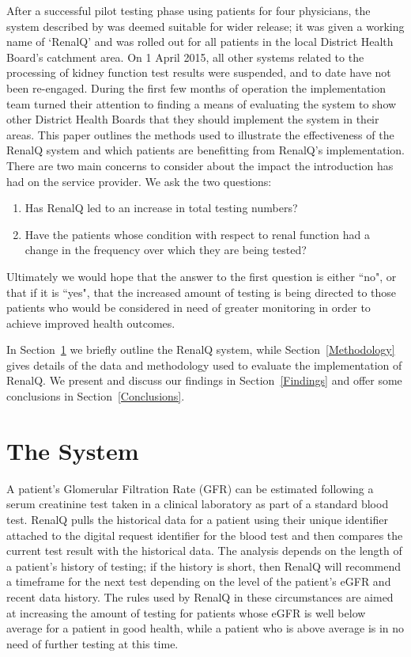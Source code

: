 After a successful pilot testing phase using patients for four physicians, the system described by \citet{GodfreyEtAl2014KidneyPaper}  was deemed suitable for wider release; it was given a working name of `RenalQ' and was rolled out for all patients in the local District Health Board's catchment area. On 1 April 2015, all other systems related to the processing of kidney function test results were suspended, and to date have not been re-engaged. %
During the first few months of operation the implementation team turned their attention to finding a means of evaluating the system to show other District Health Boards that they should implement the system in their areas. This paper outlines the methods used to illustrate the effectiveness of the RenalQ system and which patients are benefitting from RenalQ's implementation.
There are two main concerns to consider about the impact the introduction has had on the service provider. We ask the two questions: \begin{enumerate}
\item Has RenalQ led to an increase in total testing numbers?
\item Have the patients whose condition with respect to renal function had a change in the frequency over which they are being tested? 
\end{enumerate}
Ultimately we would hope that the answer to the first question is either ``no", or that if it is ``yes", that the increased amount of testing is being directed to those patients who would be considered in need of greater monitoring in order to achieve improved health outcomes.

In Section~\ref{TheSystem} we briefly outline the RenalQ	 system, while Section~\ref{Methodology} gives details of the data and methodology used to evaluate the implementation of RenalQ. We present and discuss our findings in Section~\ref{Findings} and offer some conclusions in Section~\ref{Conclusions}.

\section{The System}  \label{TheSystem} 

A patient's Glomerular Filtration Rate (GFR) can be estimated  following  a serum creatinine test taken in a clinical laboratory as part of a standard blood test. RenalQ pulls the historical data for a patient using their unique identifier attached to the digital request identifier for the blood test and then compares the current test result with the historical data. The analysis depends on the length of a patient's history of testing; if the history is short, then RenalQ will recommend a timeframe for the next test depending on the level of the patient's eGFR and recent data history. The rules used by RenalQ in these circumstances are aimed at increasing the amount of testing for patients whose eGFR is well below average for a patient in good health, while a patient who is above average is in no need of further testing at this time.
 
